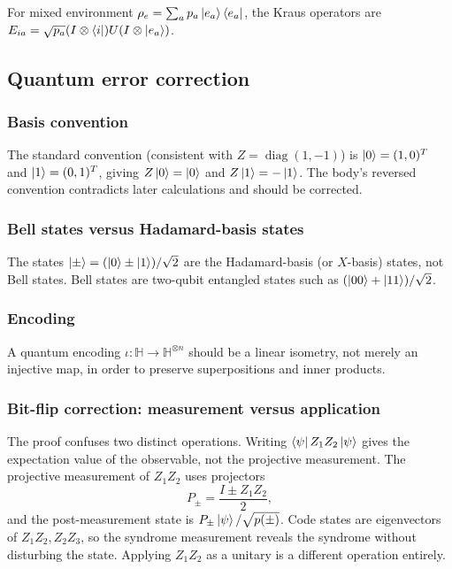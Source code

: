 \documentclass[12pt]{article}
\theoremstyle{plain}
\theoremstyle{definition}
\begin{document}
For mixed environment $\rho_e=\sum_a p_a\ket{e_a}\bra{e_a}$, the Kraus operators are $E_{ia}=\sqrt{p_a}(I\otimes\bra{i})U(I\otimes\ket{e_a})$.

\subsection{Quantum error correction}

\subsubsection*{Basis convention}

The standard convention (consistent with $Z=\operatorname{diag}(1,-1)$) is $\ket{0}=(1,0)^T$ and $\ket{1}=(0,1)^T$, giving $Z\ket{0}=\ket{0}$ and $Z\ket{1}=-\ket{1}$. The body's reversed convention contradicts later calculations and should be corrected.

\subsubsection*{Bell states versus Hadamard-basis states}

The states $\ket{\pm}=(\ket{0}\pm\ket{1})/\sqrt{2}$ are the Hadamard-basis (or $X$-basis) states, not Bell states. Bell states are two-qubit entangled states such as $(\ket{00}+\ket{11})/\sqrt{2}$.

\subsubsection*{Encoding}

A quantum encoding $\iota:\mathbb{H}\to\mathbb{H}^{\otimes n}$ should be a linear isometry, not merely an injective map, in order to preserve superpositions and inner products.

\subsubsection*{Bit-flip correction: measurement versus application}

The proof confuses two distinct operations. Writing $\bra{\psi}Z_1Z_2\ket{\psi}$ gives the expectation value of the observable, not the projective measurement. The projective measurement of $Z_1Z_2$ uses projectors
\[
P_\pm=\frac{I\pm Z_1Z_2}{2},
\]
and the post-measurement state is $P_\pm\ket{\psi}/\sqrt{p(\pm)}$. Code states are eigenvectors of $Z_1Z_2,Z_2Z_3$, so the syndrome measurement reveals the syndrome without disturbing the state. Applying $Z_1Z_2$ as a unitary is a different operation entirely.
\end{document}
